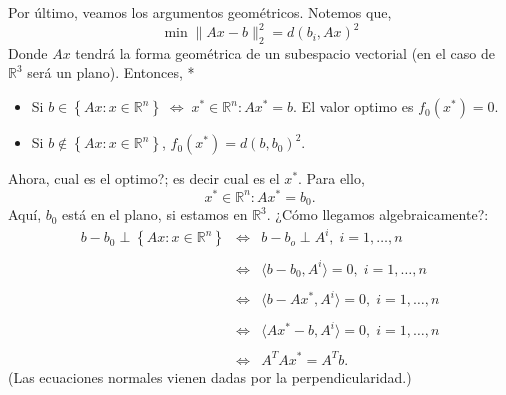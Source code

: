 \begin{paracol}{2}
\begin{ejem}
Por último, veamos los argumentos geométricos. Notemos que,
$$\min \|Ax-b\|^2_2 = d(b_i,Ax)^2$$
Donde $Ax$ tendrá la forma geométrica de un subespacio vectorial (en el caso de $\mathbb{R}^3$ será un plano). Entonces,
\switchcolumn[1]*{\noindent
\begin{center}
\end{center}
}
\switchcolumn[0]\noindent
    \begin{itemize}
	\item Si $b\in \left\{Ax:x\in \mathbb{R}^n\right\}\; \Leftrightarrow \; x^* \in \mathbb{R}^n : Ax^* =b.$ El valor optimo es $f_0(x^*)=0$.
	\item Si $b\notin \left\{Ax:x\in \mathbb{R}^n\right\}$, $f_0(x^*)=d(b,b_0)^2$.
    \end{itemize}
Ahora, cual es el optimo?; es decir cual es el $x^*$. Para ello, 
$$x^*\in \mathbb{R}^n : Ax^*=b_0.$$ Aquí, $b_0$ está en el plano, si estamos en $\mathbb{R}^3$. ¿Cómo llegamos algebraicamente?:
$$
\begin{array}{rcl}
b-b_0 \perp \left\{Ax:x\in \mathbb{R}^n\right\}&\Leftrightarrow & b-b_o \perp A^i,\; i=1,\ldots,n\\\\  
						 &\Leftrightarrow & \langle b-b_0,A^i\rangle=0,\; i=1,\ldots,n\\\\
							   &\Leftrightarrow& \langle b-Ax^*,A^i\rangle = 0, \; i=1,\ldots,n\\\\
							   &\Leftrightarrow& \langle Ax^*-b,A^i\rangle = 0, \; i=1,\ldots,n\\\\
								   &\Leftrightarrow&A^TAx^*=A^Tb.
\end{array}
$$
(Las ecuaciones normales vienen dadas por la perpendicularidad.)
\end{ejem}




\end{paracol}
